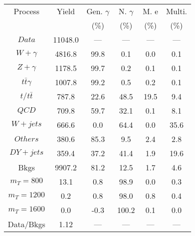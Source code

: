 \begin{figure}
\begin{minipage}[c]{0.32\textwidth}
\tiny{
\begin{tabular}{cccccc}
\hline
Process & Yield & Gen. $\gamma$ & N. $\gamma$ & M. e & Multi. \\
 &  & (\%) & (\%) & (\%) & (\%)  \\
\hline
                                                                      $ Data $ &  11048.0 &  --- &  --- &  --- &  ---\\
$ W+\gamma $ &  4816.8 &  99.8 &  0.1 &  0.0 &  0.1\\
$ Z+\gamma $ &  1178.5 &  99.7 &  0.2 &  0.1 &  0.1\\
$ t\bar{t}\gamma $ &  1007.8 &  99.2 &  0.5 &  0.2 &  0.1\\
$ t/t\bar{t} $ &  787.8 &  22.6 &  48.5 &  19.5 &  9.4\\
$ QCD $ &  709.8 &  59.7 &  32.1 &  0.1 &  8.1\\
$ W+jets $ &  666.6 &  0.0 &  64.4 &  0.0 &  35.6\\
$ Others $ &  380.6 &  85.3 &  9.5 &  2.4 &  2.8\\
$ DY+jets $ &  359.4 &  37.2 &  41.4 &  1.9 &  19.6\\
Bkgs &  9907.2 &  81.2 &  12.5 &  1.7 &  4.6\\
$ m_{T} = 800 $ &  13.1 &  0.8 &  98.9 &  0.0 &  0.3\\
$ m_{T} = 1200 $ &  0.2 &  0.8 &  98.0 &  0.8 &  0.4\\
$ m_{T} = 1600 $ &  0.0 &  -0.3 &  100.2 &  0.1 &  0.0\\
Data/Bkgs &  1.12 &  --- &  --- &  --- &  ---\\
\hline
\end{tabular}
}
\end{minipage}
\end{figure}

